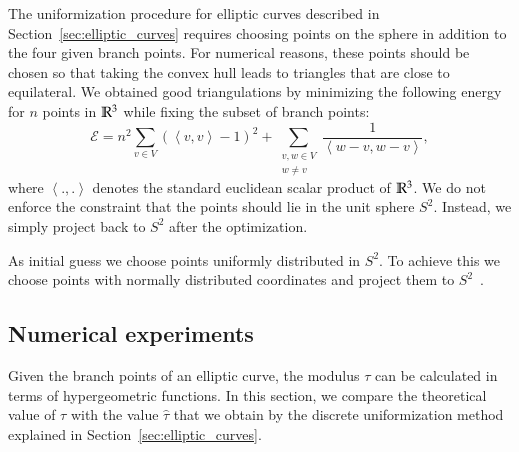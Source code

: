 \documentclass[Thesis]{subfiles}
\begin{document}
The uniformization procedure for elliptic curves described in
Section~\ref{sec:elliptic_curves} requires choosing points on the
sphere in addition to the four given branch points. For numerical
reasons, these points should be chosen so that taking the convex hull
leads to triangles that are close to equilateral. We obtained good
triangulations by minimizing the following energy for $n$ points in
$\mathbb R^{3}$ while fixing the subset of branch points:
\begin{equation}
\mathcal E = n^2\sum_{v\in V}\left( \left<v,v\right> - 1\right)^2 +
\sum_{\substack{v,w\in V\\w\neq v}} \frac{1}{\left<w-v,
    w-v\right>},
\end{equation}
where $\left<.,.\right>$ denotes the standard euclidean scalar product
of $\mathbb R^{3}$. We do not enforce the constraint that the points should
lie in the unit sphere $S^{2}$. Instead, we simply project back to $S^{2}$
after the optimization.

As initial guess we choose points uniformly distributed in $S^{2}$. To
achieve this we choose points with normally distributed coordinates
and project them to $S^2$~\cite{Muller1959}.


\subsection{Numerical experiments}
\label{sec:numerical_convergence}

Given the branch points of an elliptic curve, the
modulus $\tau$ can be calculated in terms of hypergeometric
functions. In this section, we compare the theoretical value of $\tau$
with the value $\hat\tau$ that we obtain by the discrete uniformization
method explained in Section~\ref{sec:elliptic_curves}.

\end{document}
